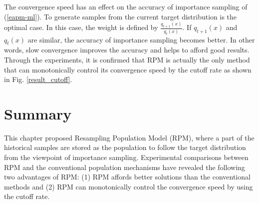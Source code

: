 The convergence speed has an effect on the
accuracy of importance sampling of (\ref{eapm-ml}).
To generate samples from the current target distribution is
the optimal case.
In this case, the weight is defined by $\frac{q_{t+1}(x)}{q_t(x)}$.
If $q_{t+1}(x)$ and $q_t(x)$ are similar, the accuracy of importance
sampling becomes better.
In other words, slow convergence improves the accuracy and
helps to afford good results.
Through the experiments,
it is confirmed that 
RPM is actually the only method that can monotonically control
its convergence speed by the cutoff rate as shown in Fig. \ref{result_cutoff}.


\section{Summary}
This chapter proposed Resampling Population Model (RPM),
where a part of the historical samples are stored as the population
to follow the target distribution
from the viewpoint of importance sampling.
Experimental comparisons between RPM and the
conventional population mechanisms have revealed
the following two advantages of RPM: 
(1) RPM affords better solutions than the conventional methods and 
(2) RPM can monotonically control the convergence speed by using the
cutoff rate.








